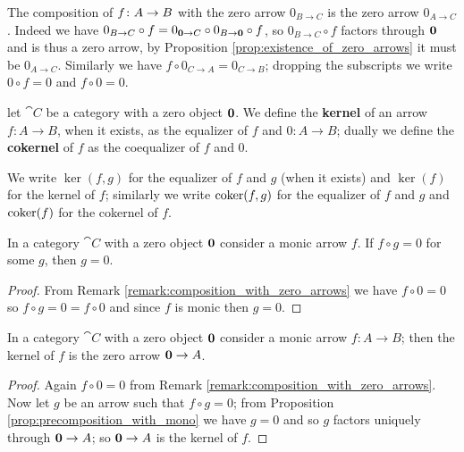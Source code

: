 \begin{remark}
  \label{remark:composition_with_zero_arrows}
  The composition of \(f\colon A\to B\) with the zero arrow \(0_{B\to C}\) is the zero arrow \(0_{A\to C}\). Indeed we have \(0_{B\to C}\circ f=0_{{\bf 0}\to C}\circ0_{B\to{\bf 0}}\circ f\), so \(0_{B\to C}\circ f\) factors through \({\bf 0}\) and is thus a zero arrow, by Proposition \ref{prop:existence_of_zero_arrows} it must be \(0_{A\to C}\). Similarly we have \(f\circ0_{C\to A}=0_{C\to B}\); dropping the subscripts we write \(0\circ f = 0\) and \(f\circ 0 = 0\).
\end{remark}

\begin{definition}
  \label{def:kernel}
  let \(\cat{C}\) be a category with a zero object \({\bf 0}\). We define the {\bf kernel} of an arrow \(f\colon A\to B\), when it exists, as the equalizer of \(f\) and \(0\colon A\to B\); dually we define the {\bf cokernel} of \(f\) as the coequalizer of \(f\) and \(0\).
\end{definition}

\begin{notation}
  \label{not:ker_coker}
  We write \(\ker(f, g)\) for the equalizer of \(f\) and \(g\) (when it exists) and \(\ker(f)\) for the kernel of \(f\); similarly we write \(\operatorname{coker}(f, g)\) for the equalizer of \(f\) and \(g\) and \(\operatorname{coker}(f)\) for the cokernel of \(f\).
\end{notation}

\begin{proposition}
  \label{prop:precomposition_with_mono}
  In a category \(\cat{C}\) with a zero object \({\bf 0}\) consider a monic arrow \(f\). If \(f\circ g = 0\) for some \(g\), then \(g = 0\).
\end{proposition}

\begin{proof}
  From Remark \ref{remark:composition_with_zero_arrows} we have \(f\circ0 = 0\) so \(f\circ g = 0 = f\circ 0\) and since \(f\) is monic then \(g=0\).
\end{proof}

\begin{proposition}
  \label{prop:the_ker_of_a_mono_is_zero}
  In a category \(\cat{C}\) with a zero object \({\bf 0}\) consider a monic arrow \(f\colon A\to B\); then the kernel of \(f\) is the zero arrow \({\bf 0}\to A\).
\end{proposition}

\begin{proof}
  Again \(f\circ0 = 0\) from Remark \ref{remark:composition_with_zero_arrows}. Now let \(g\) be an arrow such that \(f\circ g = 0\); from Proposition \ref{prop:precomposition_with_mono} we have \(g = 0\) and so \(g\) factors uniquely through \({\bf 0}\to A\); so \({\bf 0}\to A\) is the kernel of \(f\).
\end{proof}

